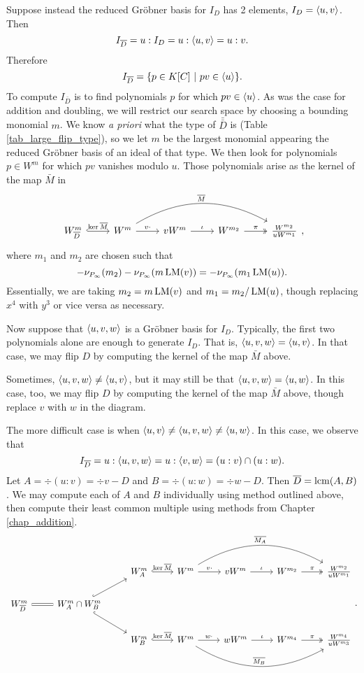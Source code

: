 Suppose instead the reduced Gr\"obner basis for $I_D$ has 2 elements, $I_D = \left\langle u,v \right\rangle$.
Then 
\[ I_{\overline D} = u : I_D = u : \left\langle u,v \right\rangle = u : v. \]
Therefore
\[ I_{\overline D} = \{ p \in K[C] ~|~ pv \in \left\langle u \right\rangle \}. \]
To compute $I_{\bar D}$ is to find polynomials $p$ for which $pv \in \left\langle u \right\rangle$.
As was the case for addition and doubling, we will restrict our search space
by choosing a bounding monomial $m$.
We know \emph{a priori} what the type of $\bar{\bar D}$ is (Table \ref{tab_large_flip_type}),
so we let $m$ be the largest monomial appearing the reduced Gr\"obner basis of an ideal of that type.
We then look for polynomials $p \in W^m$ for which $pv$ vanishes modulo $u$.
Those polynomials arise as the kernel of the map $\bar M$ in 
\[ \begin{tikzcd}
  W_{\bar D}^m \arrow[hook]{r}{\ker\bar M} &
  W^m \arrow{r}{v \cdot} \arrow[bend left]{rrr}{\bar M} &
  vW^m \arrow{r}{\iota} &
  W^{m_2} \arrow[two heads]{r}{\pi} &
  \frac {W^{m_2}} {uW^{m_1}}
\end{tikzcd}, \]
where $m_1$ and $m_2$ are chosen such that
\begin{equation}
  \label{eq_flip_monomial_choice}
  -\nu_{P_\infty}(m_2) -\nu_{P_\infty}(m\operatorname{LM}(v)) = -\nu_{P_\infty}(m_1\operatorname{LM}(u)).
\end{equation}
Essentially, we are taking $m_2 = m\operatorname{LM}(v)$ and $m_1 = m_2/\operatorname{LM}(u)$,
though replacing $x^4$ with $y^3$ or vice versa as necessary.

Now suppose that $\left\langle u,v,w \right\rangle$ is a Gr\"obner basis for $I_D$.
Typically, the first two polynomials alone are enough to generate $I_D$.
That is, $\left\langle u,v,w \right\rangle = \left\langle u,v \right\rangle$.
In that case, we may flip $D$ by computing the kernel of the map $\bar M$ above.

Sometimes, $\left\langle u,v,w \right\rangle \neq \left\langle u,v \right\rangle$, but it may still be that $\left\langle u,v,w \right\rangle = \left\langle u,w \right\rangle$.
In this case, too, we may flip $D$ by computing the kernel of the map $\bar M$ above,
though replace $v$ with $w$ in the diagram.

The more difficult case is when $\left\langle u,v \right\rangle \neq \left\langle u,v,w \right\rangle \neq \left\langle u,w \right\rangle$.
In this case, we observe that
\[ I_{\overline D} = u : \left\langle u,v,w \right\rangle = u : \left\langle v,w \right\rangle = (u : v) \cap (u : w). \]
Let $A = \div(u : v) = \div v - D$ and $B = \div(u : w) = \div w - D$.
Then $\overline D = \operatorname{lcm}(A,B)$.
We may compute each of $A$ and $B$ individually using method outlined above,
then compute their least common multiple using methods from Chapter \ref{chap_addition}.
\[ \begin{tikzcd}
  && W_A^m \arrow[hook]{r}{\ker\bar M} &
  W^m \arrow{r}{v \cdot} \arrow[bend left]{rrr}{\bar{M_A}} &
  vW^m \arrow{r}{\iota} &
  W^{m_2} \arrow[two heads]{r}{\pi} &
  \frac {W^{m_2}} {uW^{m_1}} \\
  W_{\bar D}^m \arrow[equal]{r} &
  W_A^m \cap W_B^m \arrow[hook]{ru} \arrow[hook]{rd} & \\
  && W_B^m \arrow[hook]{r}{\ker\bar M} &
  W^m \arrow{r}{w \cdot} \arrow[bend right]{rrr}{\bar{M_B}} &
  wW^m \arrow{r}{\iota} &
  W^{m_4} \arrow[two heads]{r}{\pi} &
  \frac {W^{m_4}} {uW^{m_3}}
\end{tikzcd}. \]



